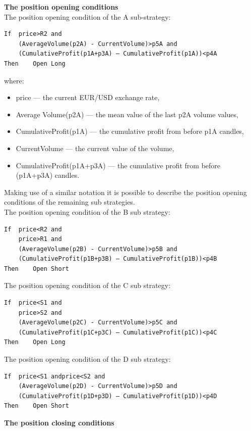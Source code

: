\documentclass{jtacs}
\begin{document}
\noindent \textbf{The position opening conditions}\\

The position opening condition of the A sub-strategy:
\begin{verbatim}
If	price>R2 and 
    (AverageVolume(p2A) - CurrentVolume)>p5A and 
    (CumulativeProfit(p1A+p3A) – CumulativeProfit(p1A))<p4A
Then 	Open Long
\end{verbatim}

\noindent where:
\begin{itemize}
\item price –-- the current EUR/USD exchange rate,
\item Average Volume(p2A) –-- the mean value of the last p2A volume values,
\item CumulativeProfit(p1A) --– the cumulative profit from before p1A candles,
\item CurrentVolume --– the current value of the volume,
\item CumulativeProfit(p1A+p3A) --– the cumulative profit from before (p1A+p3A) candles.
\end{itemize}

Making use of a similar notation it is possible to describe the position opening conditions of the remaining sub strategies.\\

The position opening condition of the B sub strategy:
\begin{verbatim}
If	price<R2 and 
    price>R1 and
    (AverageVolume(p2B) - CurrentVolume)>p5B and 
    (CumulativeProfit(p1B+p3B) – CumulativeProfit(p1B))<p4B
Then 	Open Short
\end{verbatim}

The position opening condition of the C sub strategy:
\begin{verbatim}
If	price<S1 and 
    price>S2 and
    (AverageVolume(p2C) - CurrentVolume)>p5C and
    (CumulativeProfit(p1C+p3C) – CumulativeProfit(p1C))<p4C
Then 	Open Long
\end{verbatim}

The position opening condition of the D sub strategy:
\begin{verbatim}
If	price<S1 andprice<S2 and  
    (AverageVolume(p2D) - CurrentVolume)>p5D and
    (CumulativeProfit(p1D+p3D) – CumulativeProfit(p1D))<p4D
Then 	Open Short
\end{verbatim}

\noindent \textbf{The position closing conditions}\\
\end{document}
